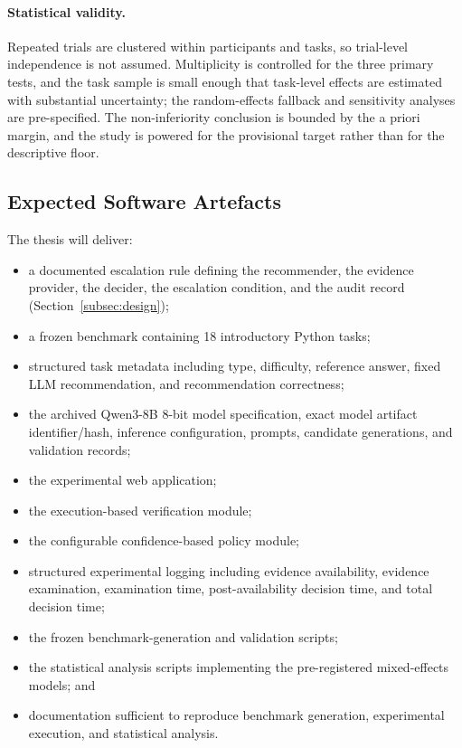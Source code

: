 \documentclass[oneside,final,14pt,a4paper]{extreport}
\begin{document}
\paragraph{Statistical validity.}
Repeated trials are clustered within participants and tasks, so trial-level
independence is not assumed. Multiplicity is controlled for the three primary
tests, and the task sample is small enough that task-level effects are
estimated with substantial uncertainty; the random-effects fallback and
sensitivity analyses are pre-specified. The non-inferiority conclusion is
bounded by the a priori margin, and the study is powered for the provisional
target rather than for the descriptive floor.


\subsection{Expected Software Artefacts}

The thesis will deliver:

\begin{itemize}

\item a documented escalation rule defining the recommender, the
evidence provider, the decider, the escalation condition, and the audit record
(Section~\ref{subsec:design});

\item a frozen benchmark containing 18 introductory Python tasks;

\item structured task metadata including type, difficulty, reference answer,
fixed LLM recommendation, and recommendation correctness;

\item the archived Qwen3-8B 8-bit model specification, exact model artifact
identifier/hash, inference configuration, prompts, candidate generations, and
validation records;

\item the experimental web application;

\item the execution-based verification module;

\item the configurable confidence-based policy module;

\item structured experimental logging including evidence availability,
evidence examination, examination time, post-availability decision time, and
total decision time;

\item the frozen benchmark-generation and validation scripts;

\item the statistical analysis scripts implementing the pre-registered
mixed-effects models; and

\item documentation sufficient to reproduce benchmark generation,
experimental execution, and statistical analysis.

\end{itemize}
\end{document}
